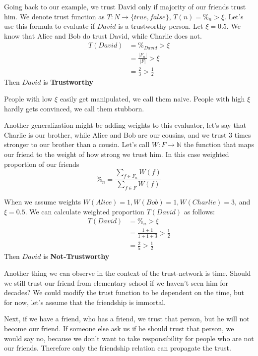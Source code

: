 Going back to our example, we trust David only if majority of our friends trust him. We denote trust function as $T : N \rightarrow \{true, false\}$, $T(n) = \%_n > \xi$. 
Let's use this formula to evaluate if $David$ is a trustworthy person. Let $\xi = 0.5$. We know that Alice and Bob do trust David, while Charlie does not.
\begin{equation}
\begin{split}
T(David) &= \%_{David} > \xi \\
&= \frac{|F_n|}{|F|} > \xi \\
&= \frac{2}{3} > \frac{1}{2}
\end{split}
\end{equation}
Then $David$ is \textbf{Trustworthy}


People with low $\xi$ easily get manipulated, we call them naive.
People with high $\xi$ hardly gets convinced, we call them stubborn. 

Another generalization might be adding weights to this evaluator, let's say that Charlie is our brother, while Alice and Bob are our cousins, and we trust 3 times stronger to our brother than a cousin. Let's call $W : F \rightarrow \mathbb{N}$ the function that maps our friend to the weight of how strong we trust him. In this case weighted proportion of our friends 
\begin{equation}
\%_n = \frac{\sum\limits_{f \in F_n} W(f)}{\sum\limits_{f \in F} W(f)}
\end{equation}

When we assume weights $W(Alice) = 1, W(Bob) = 1, W(Charlie) = 3$, and $\xi = 0.5$. We can calculate weighted proportion $T(David)$ as follows:
\begin{equation}
\begin{split}
T(David) &= \%_n > \xi \\
&= \frac{1+1}{1+1+3} > \frac{1}{2} \\
&= \frac{2}{5} > \frac{1}{2}
\end{split}
\end{equation}
Then $David$ is \textbf{Not-Trustworthy}

Another thing we can observe in the context of the trust-network is time. Should we still trust our friend from elementary school if we haven't seen him for decades? We could modify the trust function to be dependent on the time, but for now, let's assume that the friendship is immortal.

Next, if we have a friend, who has a friend, we trust that person, but he will not become our friend. If someone else ask us if he should trust that person, we would say no, because we don't want to take responsibility for people who are not our friends. Therefore only the friendship relation can propagate the trust.

